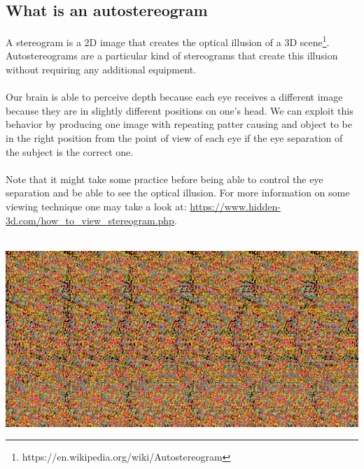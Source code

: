 \documentclass[12pt, a4paper]{article}
\begin{document}
\subsection{What is an autostereogram}
A stereogram is a 2D image that creates the optical illusion of a 3D scene\footnote{https://en.wikipedia.org/wiki/Autostereogram}. Autostereograms are a particular kind of stereograms
that create this illusion without requiring any additional equipment.\\\\
Our brain is able to perceive depth because each eye receives a different image because they are in slightly different positions on one's head.
We can exploit this behavior by producing one image with repeating patter causing and object to be in the right position from the point of view of each eye
if the eye separation of the subject is the correct one.\\\\
Note that it might take some practice before being able to control the eye separation and be able to see
the optical illusion. For more information on some viewing technique one may take a look at: \url{https://www.hidden-3d.com/how_to_view_stereogram.php}.\\\\
\begin{center}
    \centering
    \includegraphics[width=1.0\textwidth]{img/shark.png}
\end{center}
\clearpage
\end{document}
